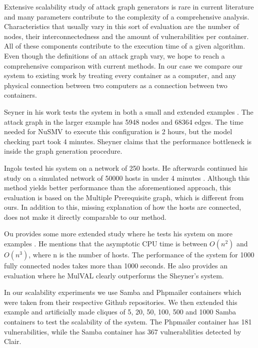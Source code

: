 Extensive scalability study of attack graph generators  is rare in current literature and many parameters contribute to the complexity of a comprehensive analysis. Characteristics that usually vary in this sort of evaluation are the number of nodes, their interconnectedness and the amount of vulnerabilities per container. All of these components contribute to the execution time of a given algorithm. Even though the definitions of an attack graph vary, we hope to reach a comprehensive comparison with current methods. In our case we compare our system to existing work by treating every container as a computer, and any physical connection between two computers as a connection between two containers. 



Seyner in his work tests the system in both a small and extended examples \cite{sheyner2002automated}. The attack graph in the larger example has 5948 nodes and 68364 edges. The time needed for NuSMV to execute this configuration is 2 hours, but the model checking part took 4 minutes. Sheyner claims that the performance bottleneck is inside the graph generation procedure. 

Ingols tested his system on a network of 250 hosts. He afterwards continued his study on a simulated network of 50000 hosts in under 4 minutes \cite{ingols2006practical}. Although this method yields better performance than the aforementioned approach, this evaluation is based on the Multiple Prerequisite graph, which is different from ours. In addition to this, missing explanation of how the hosts are connected, does not make it directly comparable to our method.

Ou provides some more extended study where he tests his system on more examples \cite{ou2006scalable}. He mentions that the asymptotic CPU time is between $O(n^2)$ and $O(n^3)$, where n is the number of hosts. The performance of the system for 1000 fully connected nodes takes more than 1000 seconds. He also provides an evaluation where he MulVAL clearly outperforms the Sheyner's system.

In our scalability experiments we use Samba \cite{samba} and Phpmailer \cite{phpmailer} containers which were taken from their respective Github repositories. We then extended this example and artificially made cliques of 5, 20, 50, 100, 500 and 1000 Samba containers to test the scalability of the system. The Phpmailer container has 181 vulnerabilities, while the Samba container has 367 vulnerabilities detected by Clair.

